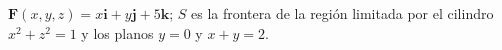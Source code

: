 \item $\mathbf{F}(x,y,z) = x\mathbf{i} + y\mathbf{j} + 5\mathbf{k}$; $S$ es la frontera de la región limitada por el cilindro $x^2 + z^2 = 1$ y los planos $y = 0$ y $x + y = 2$.
